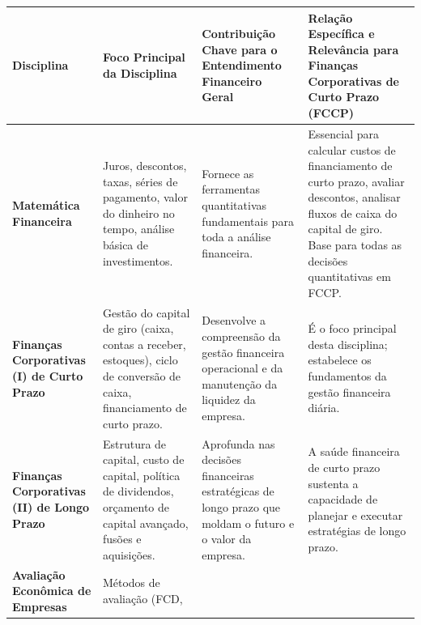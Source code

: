 \documentclass[
  a4paper,
]{book}
\begin{document}
\begin{longtable}[]{@{}
  >{\raggedright\arraybackslash}p{}
  >{\raggedright\arraybackslash}p{}
  >{\raggedright\arraybackslash}p{}
  >{\raggedright\arraybackslash}p{}@{}}
\toprule\noalign{}
\begin{minipage}[b]{\linewidth}\raggedright
Disciplina
\end{minipage} & \begin{minipage}[b]{\linewidth}\raggedright
Foco Principal da Disciplina
\end{minipage} & \begin{minipage}[b]{\linewidth}\raggedright
Contribuição Chave para o Entendimento Financeiro Geral
\end{minipage} & \begin{minipage}[b]{\linewidth}\raggedright
Relação Específica e Relevância para Finanças Corporativas de Curto
Prazo (FCCP)
\end{minipage} \\
\midrule\noalign{}
\endhead
\bottomrule\noalign{}
\endlastfoot
\textbf{Matemática Financeira} & Juros, descontos, taxas, séries de
pagamento, valor do dinheiro no tempo, análise básica de investimentos.
& Fornece as ferramentas quantitativas fundamentais para toda a análise
financeira. & Essencial para calcular custos de financiamento de curto
prazo, avaliar descontos, analisar fluxos de caixa do capital de giro.
Base para todas as decisões quantitativas em FCCP. \\
\textbf{Finanças Corporativas (I) de Curto Prazo} & Gestão do capital de
giro (caixa, contas a receber, estoques), ciclo de conversão de caixa,
financiamento de curto prazo. & Desenvolve a compreensão da gestão
financeira operacional e da manutenção da liquidez da empresa. & É o
foco principal desta disciplina; estabelece os fundamentos da gestão
financeira diária. \\
\textbf{Finanças Corporativas (II) de Longo Prazo} & Estrutura de
capital, custo de capital, política de dividendos, orçamento de capital
avançado, fusões e aquisições. & Aprofunda nas decisões financeiras
estratégicas de longo prazo que moldam o futuro e o valor da empresa. &
A saúde financeira de curto prazo sustenta a capacidade de planejar e
executar estratégias de longo prazo. \\
\textbf{Avaliação Econômica de Empresas} & Métodos de avaliação (FCD,

\end{longtable}
\end{document}
